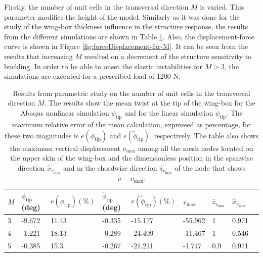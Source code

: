     Firstly, the number of unit cells in the transversal direction $M$ is varied. This parameter modifies the height of the model. Similarly as it was done for the study of the wing-box thickness \boxt influence in the structure response, the results from the different simulations are shown in Table \ref{tab:para_M}. Also, the displacement-force curve is shown in Figure \ref{fig:forceDisplacement-far-M}. It can be seen from the results that increasing $M$ resulted on a decrement of the structure sensitivity to buckling. In order to be able to onset the elastic instabilities for $M > 3$, the simulations are executed for a prescribed load of 1200 N.

    \begin{table}[!htpb] %
      \centering
      \begin{tabular}{|l|l|l|l|l|l|l|l|l|}
      \hline
      $M$ & $\phi_{\mathrm{tip}}$ (deg) & $e(\phi_{\mathrm{tip}}) (\%)$ & $\tilde{\phi}_{\mathrm{tip}}$ (deg) & $e(\tilde{\phi}_{\mathrm{tip}}) (\%)$ & $v_{\mathrm{max}}$ & $\hat{z}_{v_{\mathrm{max}}}$ & $\hat{x}_{v_{\mathrm{max}}}$ \\ \hline
      3 & -9.672 & 11.43 & -0.335 & -15.177 & -55.962 & 1   & 0.971 \\ \hline
      4 & -1.221 & 18.13 & -0.289 & -24.409 & -11.467 & 1   & 0.546 \\ \hline
      5 & -0.385 & 15.3  & -0.267 & -21.211 & -1.747  & 0.9 & 0.971 \\ \hline
      \end{tabular}
      \caption[Results from parametric study on the number of unit cells in the transversal direction]{Results from parametric study on the number of unit cells in the transversal direction $M$. The results show the mean twist at the tip of the wing-box for the Abaqus nonlinear simulation $\phi_{\mathrm{tip}}$ and for the linear simulation $\tilde{\phi}_{\mathrm{tip}}$. The maximum relative error of the mean calculation, expressed as percentage, for these two magnitudes is $e(\phi_{\mathrm{tip}})$ and $e(\tilde{\phi}_{\mathrm{tip}})$, respectively. The table also shows the maximum vertical displacement $v_{\mathrm{max}}$ among all the mesh nodes located on the upper skin of the wing-box and the dimensionless position in the spanwise direction $\hat{x}_{v_{\mathrm{max}}}$ and in the chordwise direction $\hat{z}_{v_{\mathrm{max}}}$ of the node that shows $v = v_{\mathrm{max}}$.}
      \label{tab:para_M}
    \end{table}

